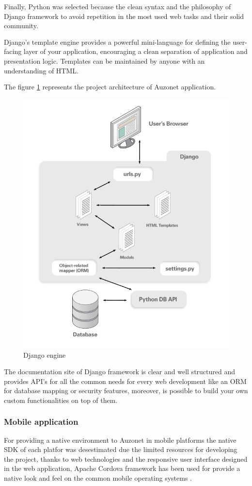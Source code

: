 \documentclass{DeustoFDP}
\begin{document}
Finally, Python was selected because the clean syntax and the philosophy of Django framework to avoid repetition in the most used web tasks and their solid community.

Django’s template engine provides a powerful mini-language for defining the user-facing layer of your application, encouraging a clean separation of application and presentation logic. Templates can be maintained by anyone with an understanding of HTML.

The figure \ref{fig:djangoarchitecture} represents the project architecture of Auzonet application.

\begin{figure}[h!]
\centering
\includegraphics[width=0.9\linewidth]{fig/djangoarchitecture}
\caption[Django engine]{Django engine}
\label{fig:djangoarchitecture}
\end{figure}


The documentation site of Django framework \cite{Djangodocs} is clear and well structured and provides API's for all the common needs for every web development like an ORM for database mapping or security features, moreover, is possible to build your own custom functionalities on top of them.
\newpage
\subsubsection{Mobile application}
For providing a native environment to Auzonet in mobile platforms the native SDK of each platfor was desestimated due the limited resources for developing the project, thanks to web technologies and the responsive user interface designed in the web application, Apache Cordova framework has been used for provide a native look and feel on the common mobile operating systems \cite{convertingwebapps}.
\end{document}

